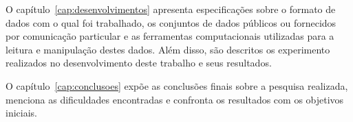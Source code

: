 O capítulo~\ref{cap:desenvolvimentos} apresenta especificações sobre o formato de dados com o qual foi trabalhado, os conjuntos de dados públicos ou fornecidos por comunicação particular e as ferramentas computacionais utilizadas para a leitura e manipulação destes dados. Além disso, são descritos os experimento realizados no desenvolvimento deste trabalho e seus resultados.

O capítulo~\ref{cap:conclusoes} expõe as conclusões finais sobre a pesquisa realizada, menciona as dificuldades encontradas e confronta os resultados com os objetivos iniciais.
